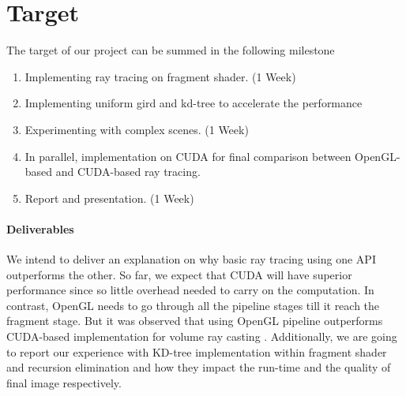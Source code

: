 \section{Target}
The target of our project can be summed in the following milestone 
\begin{enumerate}
\item Implementing ray tracing on fragment shader. (1 Week)
\item Implementing uniform gird and kd-tree to accelerate the performance
\item Experimenting with complex scenes. (1 Week)
\item In parallel, implementation on CUDA for final comparison between OpenGL-based and CUDA-based ray tracing.
\item Report and presentation. (1 Week)
\end{enumerate}

\paragraph{Deliverables} We intend to deliver an explanation on why basic ray tracing using one API outperforms the other. So far, we expect that CUDA will have superior performance since so little overhead needed to carry on the computation. In contrast, OpenGL needs to go through all the pipeline stages till it reach the fragment stage. But it was observed that using OpenGL pipeline outperforms CUDA-based implementation for volume ray casting \cite{7833400}. Additionally, we are going to report our experience with KD-tree implementation within fragment shader and recursion elimination and how they impact the run-time and the quality of final image respectively. 